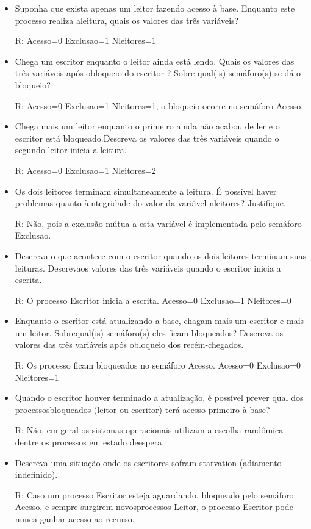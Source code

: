 \begin{itemize}
 
\item Suponha que exista apenas um leitor fazendo acesso à
  base. Enquanto este processo realiza aleitura, quais os valores das
  três variáveis?  

  R: Acesso=0 Exclusao=1 Nleitores=1
 
\item Chega um escritor enquanto o leitor ainda está lendo. Quais os
  valores das três variáveis após obloqueio do escritor ? Sobre
  qual(is) semáforo(s) se dá o bloqueio?  

R: Acesso=0 Exclusao=1 Nleitores=1, o bloqueio ocorre no semáforo
Acesso.
 
\item Chega mais um leitor enquanto o primeiro ainda não acabou de ler
  e o escritor está bloqueado.Descreva os valores das três variáveis
  quando o segundo leitor inicia a leitura.  

R: Acesso=0 Exclusao=1 Nleitores=2
 
\item Os dois leitores terminam simultaneamente a leitura. É possível
  haver problemas quanto àintegridade do valor da variável nleitores?
  Justifique.  

R: Não, pois a exclusão mútua a esta variável é implementada pelo
semáforo Exclusao.
 
\item Descreva o que acontece com o escritor quando os dois leitores
  terminam suas leituras. Descrevaos valores das três variáveis quando
  o escritor inicia a escrita.  
  
  R: O processo Escritor inicia a escrita. Acesso=0 Exclusao=1
  Nleitores=0
 
\item Enquanto o escritor está atualizando a base, chagam mais um
  escritor e mais um leitor. Sobrequal(is) semáforo(s) eles ficam
  bloqueados? Descreva os valores das três variáveis após obloqueio
  dos recém-chegados.  

R: Os processo ficam bloqueados no semáforo Acesso. Acesso=0
Exclusao=0 Nleitores=1
 
\item Quando o escritor houver terminado a atualização, é possível
  prever qual dos processosbloqueados (leitor ou escritor) terá acesso
  primeiro à base?  

R: Não, em geral os sistemas operacionais utilizam a escolha randômica
dentre os processos em estado deespera.
 
\item Descreva uma situação onde os escritores sofram starvation
  (adiamento indefinido).  

  R: Caso um processo Escritor esteja aguardando, bloqueado pelo
  semáforo Acesso, e sempre surgirem novosprocessos Leitor, o processo
  Escritor pode nunca ganhar acesso ao recurso.
\end{itemize}



